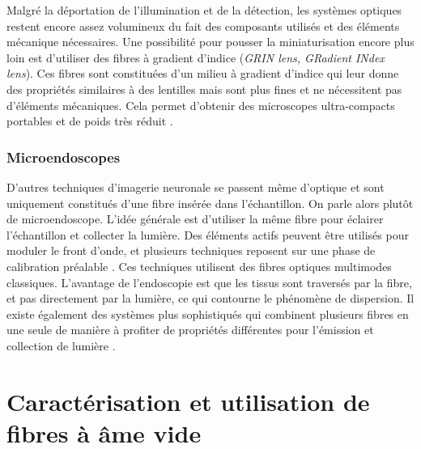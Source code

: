 Malgré la déportation de l'illumination et de la détection, les systèmes optiques restent encore assez volumineux du fait des composants utilisés et des éléments mécanique nécessaires. Une possibilité pour pousser la miniaturisation encore plus loin est d'utiliser des fibres à gradient d'indice (\emph{GRIN lens, GRadient INdex lens}). Ces fibres sont constituées d'un milieu à gradient d'indice qui leur donne des propriétés similaires à des lentilles mais sont plus fines et ne nécessitent pas d'éléments mécaniques. Cela permet d'obtenir des microscopes ultra-compacts portables et de poids très réduit \cite{flusberg_vivo_2005}\cite{engelbrecht_ultra-compact_2008}.

\subsubsection{Microendoscopes}


D'autres techniques d'imagerie neuronale se passent même d'optique et sont uniquement constitués d'une fibre insérée dans l'échantillon. On parle alors plutôt de microendoscope. L'idée générale est d'utiliser la même fibre pour éclairer l'échantillon et collecter la lumière. Des éléments actifs peuvent être utilisés pour moduler le front d'onde, et plusieurs techniques reposent sur une phase de calibration préalable \cite{papadopoulos_high-resolution_2013}\cite{ohayon_minimally_2018}\cite{turtaev_high-fidelity_2018}. Ces techniques utilisent des fibres optiques multimodes classiques. L'avantage de l'endoscopie est que les tissus sont traversés par la fibre, et pas directement par la lumière, ce qui contourne le phénomène de dispersion. Il existe également des systèmes plus sophistiqués qui combinent plusieurs fibres en une seule de manière à profiter de propriétés différentes pour l'émission et collection de lumière \cite{andresen_two-photon_2013}\cite{kudlinski_double_2020}\cite{lombardini_high-resolution_2018}.



\section{Caractérisation et utilisation de fibres à âme vide}

